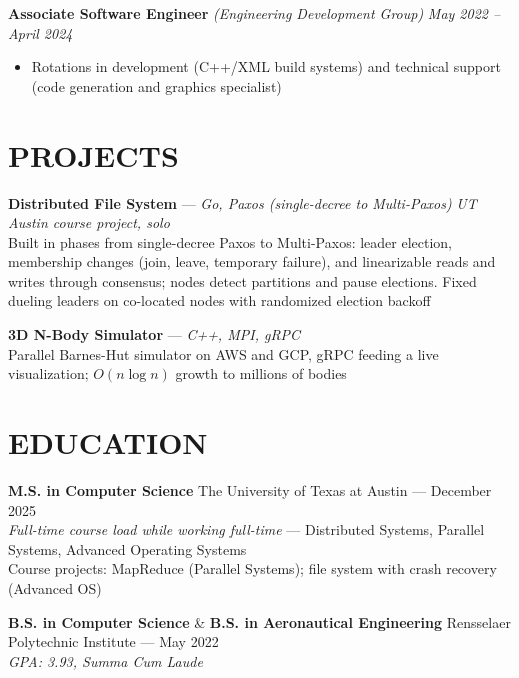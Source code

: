 \documentclass{article}
\begin{document}
{\large \textbf{Associate Software Engineer}} \textit{(Engineering Development Group)} \hfill \textit{May 2022 -- April 2024}
\begin{itemize}[leftmargin=*]
    \item Rotations in development (C++/XML build systems) and technical support (code generation and graphics specialist)
\end{itemize}

\section*{PROJECTS}
\textbf{Distributed File System} — \textit{Go, Paxos (single-decree to Multi-Paxos)} \hfill \textit{UT Austin course project, solo} \\
Built in phases from single-decree Paxos to Multi-Paxos: leader election, membership changes (join, leave, temporary failure), and linearizable reads and writes through consensus; nodes detect partitions and pause elections. Fixed dueling leaders on co-located nodes with randomized election backoff

\textbf{3D N-Body Simulator} — \textit{C++, MPI, gRPC} \\
Parallel Barnes-Hut simulator on AWS and GCP, gRPC feeding a live visualization; $O(n \log n)$ growth to millions of bodies

\section*{EDUCATION}
\textbf{M.S. in Computer Science} \hfill The University of Texas at Austin — December 2025 \\
\textit{Full-time course load while working full-time} — Distributed Systems, Parallel Systems, Advanced Operating Systems \\
Course projects: MapReduce (Parallel Systems); file system with crash recovery (Advanced OS)

\textbf{B.S. in Computer Science} \& \textbf{B.S. in Aeronautical Engineering} \hfill Rensselaer Polytechnic Institute — May 2022 \\
\textit{GPA: 3.93, Summa Cum Laude}
\end{document}
